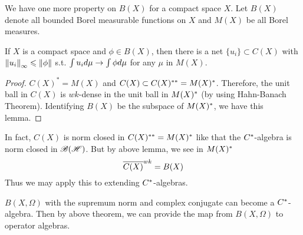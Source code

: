 \documentclass[a4paper,11pt]{report}
\begin{document}
We have one more property on $B(X)$ for a compact space $X$. Let $B(X)$ denote all bounded Borel measurable functions on $X$ and $M(X)$ be all Borel measures.

\begin{lem}
	If $X$ is a compact space and $\phi \in B(X)$, then there is a net $\{u_i\} \subset C(X)$ with $\left\lVert u_i\right\lVert_{\infty} \leqslant \left\lVert\phi\right\lVert$ s.t. $\int u_i d\mu \rightarrow \int \phi d\mu$ for any $\mu$ in $M(X)$.
\end{lem}
\begin{proof}
	$C(X)^{*} = M(X)$ and $C(X) \subset C(X)^{**} = M(X)^{*}$.  Therefore, the unit ball in $C(X)$ is $wk$-dense in the unit ball in $M(X)^{*}$ (by using Hahn-Banach Theorem). Identifying $B(X)$ be the subspace of $M(X)^{*}$, we have this lemma.
\end{proof}
\begin{rem}
	In fact, $C(X)$ is norm closed in $C(X)^{**} = M(X)^{*}$ like that the $C^{*}$-algebra is norm closed in $\mathscr{B(H)}$. But by above lemma, we see in $M(X)^{*}$
	\begin{equation*}
		\overline{C(X)}^{wk} = B(X)
	\end{equation*}
	Thus we may apply this to extending $C^{*}$-algebras.
\end{rem}

$B(X,\Omega)$ with the supremum norm and complex conjugate can become a $C^{*}$-algebra. Then by above theorem, we can provide the map from $B(X,\Omega)$ to operator algebras.
\end{document}
